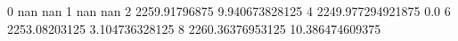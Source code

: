 0 nan nan
1 nan nan
2 2259.91796875 9.940673828125
4 2249.977294921875 0.0
6 2253.08203125 3.104736328125
8 2260.36376953125 10.386474609375
